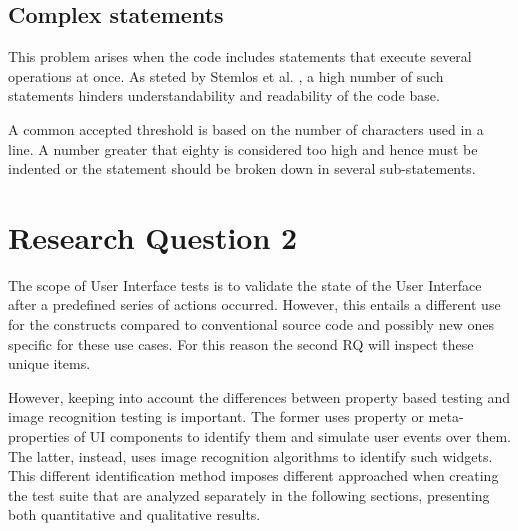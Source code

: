 \FloatBarrier

\subsection{Complex statements}
This problem arises when the code includes statements that execute several operations at once. As steted by Stemlos et al. \cite{metrics_source_code}, a high number of such statements hinders understandability and readability of the code base.

A common accepted threshold is based on the number of characters used in a line. A number greater that eighty is considered too high and hence must be indented or the statement should be broken down in several sub-statements.



\section{Research Question 2}

The scope of User Interface tests is to validate the state of the User Interface after a predefined series of actions occurred. However, this entails a different use for the constructs compared to conventional source code and possibly new ones specific for these use cases. For this reason the second RQ will inspect these unique items.

However, keeping into account the differences between property based testing and image recognition testing is important. The former uses property or meta-properties of UI components to identify them and simulate user events over them. The latter, instead, uses image recognition algorithms to identify such widgets. This different identification method imposes different approached when creating the test suite that are analyzed separately in the following sections, presenting both quantitative and qualitative results.


